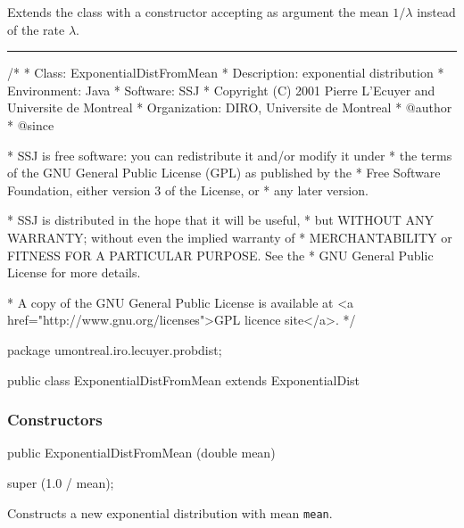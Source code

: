 
Extends the  class with a constructor accepting as
argument the mean $1/\lambda$ instead of the rate $\lambda$.

\bigskip\hrule\bigskip

\begin{code}
\begin{hide}
/*
 * Class:        ExponentialDistFromMean
 * Description:  exponential distribution
 * Environment:  Java
 * Software:     SSJ 
 * Copyright (C) 2001  Pierre L'Ecuyer and Universite de Montreal
 * Organization: DIRO, Universite de Montreal
 * @author       
 * @since

 * SSJ is free software: you can redistribute it and/or modify it under
 * the terms of the GNU General Public License (GPL) as published by the
 * Free Software Foundation, either version 3 of the License, or
 * any later version.

 * SSJ is distributed in the hope that it will be useful,
 * but WITHOUT ANY WARRANTY; without even the implied warranty of
 * MERCHANTABILITY or FITNESS FOR A PARTICULAR PURPOSE.  See the
 * GNU General Public License for more details.

 * A copy of the GNU General Public License is available at
   <a href="http://www.gnu.org/licenses">GPL licence site</a>.
 */
\end{hide}
package umontreal.iro.lecuyer.probdist;

public class ExponentialDistFromMean extends ExponentialDist\begin{hide} {
\end{hide}
\end{code}


\subsubsection* {Constructors}

\begin{code}

   public ExponentialDistFromMean (double mean)\begin{hide} {
      super (1.0 / mean);
   }\end{hide}
\end{code}
\begin{tabb} Constructs a new exponential distribution with mean \texttt{mean}.
\end{tabb}
\begin{htmlonly}
\end{htmlonly}


